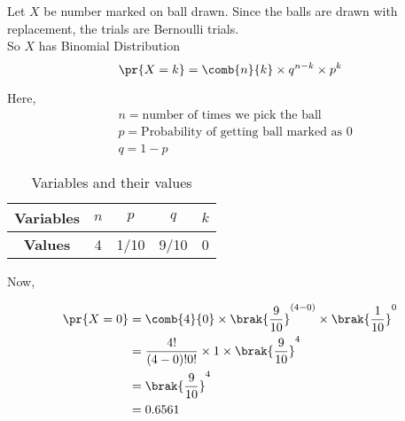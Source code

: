 Let $X$ be number marked on ball drawn.
Since the balls are drawn with replacement, the trials are Bernoulli trials.
\\
So $X$ has Binomial Distribution 
\begin{equation}
    \pr {X=k}=\comb{n}{k} \times q^{n-k} \times p^{k} 
\end{equation} 

Here,
\begin{align}
& n = \text {number of times we pick the ball}  \\
& p= \text{Probability of getting ball marked as 0} \\
& q=1-p
\end{align}

\begin{table}[h!]
\centering

\begin{tabular}{|c|c|c|c|c|}
\hline
\textbf{Variables} & $n$ & $p$    & $q$    & $k$          \\ \hline
\textbf{Values}    & 4 & 1/10 & 9/10 & 0 \\ \hline
\end{tabular}
\caption{Variables and their values}
\label{4.7:table:1}
\end{table}

Now,

\begin{align}
\pr{X=0} &= \comb{4}{0} \times \brak{\frac{9}{10}}^{(4-0)} \times \brak{\frac{1}{10}}^{0} \\
&=\frac{4!}{(4-0)! 0!} \times 1 \times \brak{\frac{9}{10}}^{4} \\
&=\brak { \frac{9}{10} } ^{4} \\
&= 0.6561
\end{align}